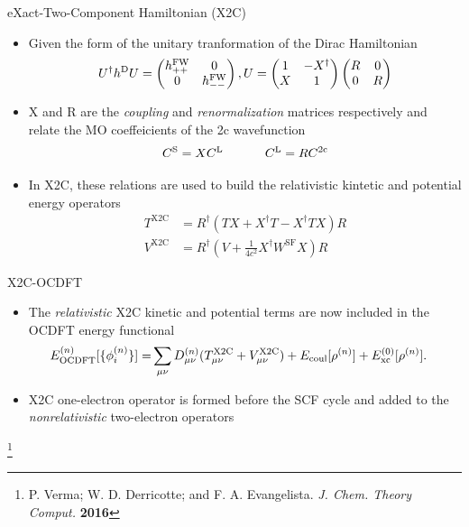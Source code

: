 \documentclass[t]{beamer}
\newcommand\blfootnote[1]{%
  \begingroup
  \renewcommand\thefootnote{}\footnote{#1}%
  \addtocounter{footnote}{-1}%
  \endgroup
}
\begin{document}
\begin{frame}{eXact-Two-Component Hamiltonian (X2C)}
\begin{itemize}
\item Given the form of the unitary tranformation of the Dirac Hamiltonian
\begin{equation}
U^\dagger h^{\rm D} U = 
 \begin{pmatrix}
h^{\rm FW}_{++} & 0 \\
0 & h^{\rm FW}_{--}
\end{pmatrix},
U = 
\begin{pmatrix}
1 & -X^{\dagger} \\
X & 1
\end{pmatrix}
\begin{pmatrix}
R & 0 \\
0 & R
\end{pmatrix}
\end{equation}
\item X and R are the \textit{coupling} and \textit{renormalization} matrices respectively and relate the MO coeffeicients of the 2c wavefunction
\begin{equation}
C^{\rm S} = XC^{\rm L} \ \ \ \ \ \ \ \ \ \ C^{\rm L} = R C^{\rm 2c}
\end{equation}
\item In X2C, these relations are used to build the relativistic kintetic and potential energy operators
\begin{align}
	T^{\text{X2C}}&= R^{\dagger} (TX +  {X}^{\dagger}T - {X}^{\dagger}TX ) R \\ 
	V^{\text{X2C}} &=  R^{\dagger}(V + \frac{1}{4c^2} X^{\dagger}W^{\text{SF}}X) R
\end{align}
\end{itemize}
\end{frame}

\begin{frame}{X2C-OCDFT}
\begin{itemize}
\item The \textit{relativistic} X2C kinetic and potential terms are now included in the OCDFT energy functional
\begin{align}
\nonumber
E^{(n)}_{\rm OCDFT}[\{\phi^{(n)}_i\}]=& \sum_{\mu \nu} D^{(n)}_{\mu \nu}(T^{\rm X2C}_{\mu \nu} + V^{\rm X2C}_{\mu \nu}) + E_{\rm coul}[\rho^{(n)}] + E^{(0)}_{\rm xc}[\rho^{(n)}]. 
\end{align}
\item X2C one-electron operator is formed before the SCF cycle and added to the \textit{nonrelativistic} two-electron operators
\end{itemize}
\blfootnote{P. Verma; W. D. Derricotte; and F. A. Evangelista. \textit{J. Chem. Theory Comput.} \textbf{2016}}
\end{frame}
\end{document}
